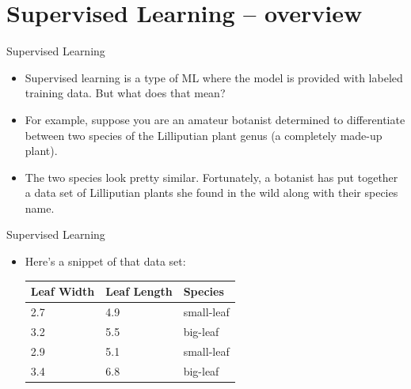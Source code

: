 \documentclass{beamer}
\begin{document}

\section{Supervised Learning -- overview}

\begin{frame}{Supervised Learning}

\begin{itemize}
\item Supervised learning is a type of ML where the model is provided with labeled training data. But what does that mean?

\item For example, suppose you are an amateur botanist determined to differentiate between two species of the Lilliputian plant genus (a completely made-up plant). 

\item The two species look pretty similar. Fortunately, a botanist has put together a data set of Lilliputian plants she found in the wild along with their species name.

\end{itemize}

\end{frame}


\begin{frame}{Supervised Learning}

\begin{itemize}
\item Here's a snippet of that data set:

\bigskip
\begin{tabular}{lll}
Leaf Width & Leaf Length & Species \\ \hline
2.7	& 4.9 & small-leaf \\
3.2	& 5.5 & big-leaf \\
2.9	& 5.1 & small-leaf \\
3.4	& 6.8 & big-leaf 
\end{tabular}

\end{itemize}

\end{frame}

\end{document}
